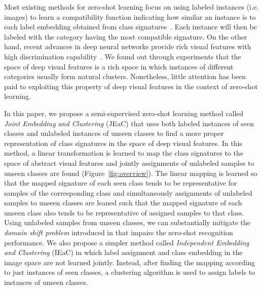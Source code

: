 \documentclass[10pt,twocolumn,letterpaper]{article}
\begin{document}
Most existing methods for zero-shot learning focus on using labeled instances (i.e. images) to learn a compatibility function indicating how similar an instance is
to each label embedding obtained from class signatures~\cite{Akata2015,emb15,sse}. Each instance will then be labeled with the category having the most compatible signature.
 On the other hand, recent advances in deep neural networks provide rich visual features with high discrimination capability~\cite{vgg}.
We found out through experiments that the space of deep visual features is a rich space in which instances of different categories usually form natural clusters.
Nonetheless, little attention has been paid to exploiting this property of deep visual features in the context of zero-shot learning.


In this paper, we propose a semi-supervised zero-shot
learning method called \textit{Joint Embedding and Clustering} (JEaC) that uses both labeled instances of seen
classes and unlabeled instances of unseen classes to find a
more proper representation of class signatures in the space of deep visual features. In this method, a linear transformation
is learned to map the class signatures to the space of
abstract visual features and jointly assignments of unlabeled
samples to unseen classes are found (Figure~\ref{fig:overview}).
The linear mapping is learned so that the mapped signature of each seen class tends to be representative
for samples of the corresponding class and simultaneously
assignments of unlabeled samples to unseen classes are leaned such that the mapped signature of each unseen class
 also tends to be representative of assigned samples to that class.
 Using unlabeled samples from unseen classes, we can substantially mitigate
the \textit{domain shift problem} introduced in \cite{eccv14} that impairs the zero-shot recognition performance.
We also propose a simpler method called \textit{Independent Embedding and Clustering} (IEaC) in which label assignment and class embedding in the image space are not learned jointly. Instead,
after finding the mapping according to just instances of seen
classes, a clustering algorithm is used to assign labels to instances
of unseen classes.
\end{document}
